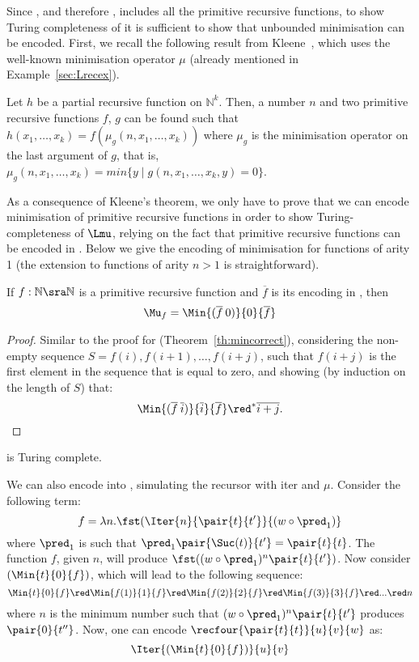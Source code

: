 \documentclass{article}
\begin{document}
Since \LLCI, and therefore \LLCIm, includes all the primitive recursive
functions, to show Turing completeness of \LLCIm it is sufficient to
show that unbounded minimisation can be encoded.  First, we recall the
following result from Kleene~\cite{klee:intr52}, which uses the well-known
minimisation operator $\mu$ (already mentioned in Example~\ref{sec:Lrecex}).

\begin{theorem} 
Let $h$ be a partial recursive function on $\mathbb{N}^k$. Then, a number
$n$ and two primitive recursive functions $f$, $g$ can be found such that
\(
h(x_1,\ldots,x_k) = f(\mu_g(n,x_1,\dots,x_k))
\)
where $\mu_g$ is the minimisation operator on the last argument of $g$, that is,
$\mu_g(n,x_1,\ldots, x_k) = min\{y \mid g(n,x_1,\dots,x_k,y) = 0\}$.
\end{theorem} 

As a consequence of Kleene's theorem, we only have to prove that we
can encode minimisation of primitive recursive functions in order to
show Turing-completeness of $\Lmu$, relying on the fact that primitive
recursive functions can be encoded in \LLCI. Below we give the
encoding of minimisation for functions of arity 1 (the extension to
functions of arity $n > 1$ is straightforward).

\begin{theorem} 
\label{th:encmin}
If $f : \mathbb{N} \sra \mathbb{N}$ is
 a primitive recursive function and $\overline{f}$ is its encoding in \LLCIm, then
$$\Mu_f = \Min{(\overline{f}\: 0)}{0}{\overline{f}}$$
\end{theorem}

\begin{proof} 
Similar to the proof for \LLCIrec (Theorem~\ref{th:mincorrect}), considering the non-empty sequence $S=f(i),f(i+1),\dots,f(i+j)$, such that $f(i+j)$ is the first element in the sequence that is equal to
zero, and showing (by induction on the length of $S$) that: $$\Min{(\overline{f}\:
  \overline{i})}{\overline{i}}{\overline{f}} \red^* \overline{i+j}.$$
\end{proof}
\begin{corollary} 
\LLCIm is Turing complete.
\end{corollary}
We can also encode \LLCIrec into \LLCIm, simulating the recursor with iter
and $\mu$. Consider the following term:
$$f = \lambda n. \fst(\Iter{n}{\pair{t}{t'}}{(w \circ \pred_1 )}$$ where $\pred_1$ is such that
$\pred_1 \pair{\Suc(t)}{t'} = \pair{t}{t}$. The function $f$, given $n$, will produce $\fst((w \circ \pred_1)^n \pair{t}{t'})$. Now consider $(\Min{t}{0}{f})$, which will lead to the following sequence:
$$\Min{t}{0}{f} \red \Min{f(1)}{1}{f} \red \Min{f(2)}{2}{f} \red \Min{f(3)}{3}{f} \red ... \red n$$  
where $n$ is the minimum number such that $(w \circ \pred_1)^n \pair{t}{t'}$  
produces $\pair{0}{t''}$.
Now, one can encode $\recfour{\pair{t}{t}}{u}{v}{w}$ as:
$$\Iter{(\Min{t}{0}{f})}{u}{v}$$
\end{document}
